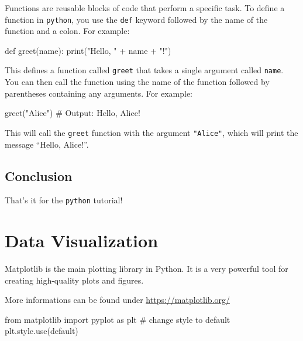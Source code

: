 \documentclass[
  letterpaper,
  DIV=11,
  numbers=noendperiod]{scrreprt}
\newenvironment{Shaded}{\begin{snugshade}}{\end{snugshade}}
\newcommand{\BuiltInTok}[1]{\textcolor[rgb]{0.00,0.23,0.31}{#1}}
\newcommand{\CommentTok}[1]{\textcolor[rgb]{0.37,0.37,0.37}{#1}}
\newcommand{\ImportTok}[1]{\textcolor[rgb]{0.00,0.46,0.62}{#1}}
\newcommand{\KeywordTok}[1]{\textcolor[rgb]{0.00,0.23,0.31}{#1}}
\newcommand{\NormalTok}[1]{\textcolor[rgb]{0.00,0.23,0.31}{#1}}
\newcommand{\OperatorTok}[1]{\textcolor[rgb]{0.37,0.37,0.37}{#1}}
\newcommand{\StringTok}[1]{\textcolor[rgb]{0.13,0.47,0.30}{#1}}
\begin{document}
Functions are reusable blocks of code that perform a specific task. To
define a function in \texttt{python}, you use the \texttt{def} keyword
followed by the name of the function and a colon. For example:

\begin{Shaded}
\begin{Highlighting}[]
\KeywordTok{def}\NormalTok{ greet(name):}
  \BuiltInTok{print}\NormalTok{(}\StringTok{"Hello, "} \OperatorTok{+}\NormalTok{ name }\OperatorTok{+} \StringTok{"!"}\NormalTok{)}
\end{Highlighting}
\end{Shaded}

This defines a function called \texttt{greet} that takes a single
argument called \texttt{name}. You can then call the function using the
name of the function followed by parentheses containing any arguments.
For example:

\begin{Shaded}
\begin{Highlighting}[]
\NormalTok{greet(}\StringTok{"Alice"}\NormalTok{) }\CommentTok{\# Output: Hello, Alice!}
\end{Highlighting}
\end{Shaded}

This will call the \texttt{greet} function with the argument
\texttt{"Alice"}, which will print the message ``Hello, Alice!''.

\hypertarget{conclusion}{%
\section{Conclusion}\label{conclusion}}

That's it for the \texttt{python} tutorial!

\hypertarget{data-visualization}{%
\chapter{Data Visualization}\label{data-visualization}}

Matplotlib is the main plotting library in Python. It is a very powerful
tool for creating high-quality plots and figures.

More informations can be found under \url{https://matplotlib.org/}

\begin{Shaded}
\begin{Highlighting}[]
\ImportTok{from}\NormalTok{ matplotlib }\ImportTok{import}\NormalTok{ pyplot }\ImportTok{as}\NormalTok{ plt}
\CommentTok{\# change style to default }
\NormalTok{plt.style.use(}\StringTok{\textquotesingle{}default\textquotesingle{}}\NormalTok{)}
\end{Highlighting}
\end{Shaded}
\end{document}
